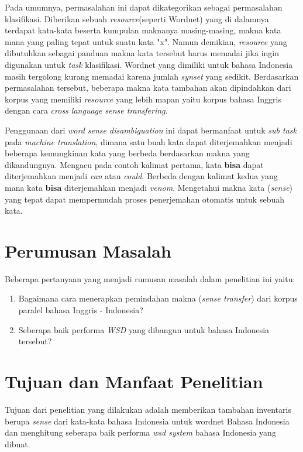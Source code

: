 Pada umumnya, permasalahan ini dapat dikategorikan sebagai permasalahan klasifikasi. Diberikan sebuah \textit{resource}(seperti Wordnet) yang di dalamnya terdapat kata-kata beserta kumpulan maknanya masing-masing, makna kata mana yang paling tepat untuk suatu kata "x". Namun demikian, \textit{resource} yang dibutuhkan sebagai panduan makna kata tersebut harus memadai jika ingin digunakan untuk \textit{task} klasifikasi. Wordnet yang dimiliki untuk bahasa Indonesia masih tergolong kurang memadai karena jumlah \textit{synset} yang sedikit. Berdasarkan permasalahan tersebut, beberapa makna kata tambahan akan dipindahkan dari korpus yang memiliki \textit{resource} yang lebih mapan yaitu korpus bahasa Inggris dengan cara \textit{cross language sense transfering}.

Penggunaan dari \textit{word sense disambiguation} ini dapat bermanfaat untuk \textit{sub task} pada \textit{machine translation}, dimana satu buah kata dapat diterjemahkan menjadi beberapa kemungkinan kata yang berbeda berdasarkan makna yang dikandungnya. Mengacu pada contoh kalimat pertama, kata \textbf{bisa} dapat diterjemahkan menjadi \textit{can} atau \textit{could}. Berbeda dengan kalimat kedua yang mana kata \textbf{bisa} diterjemahkan menjadi \textit{venom}. Mengetahui makna kata (\textit{sense}) yang tepat dapat mempermudah proses penerjemahan otomatis untuk sebuah kata.

\section{Perumusan Masalah}
Beberapa pertanyaan yang menjadi rumusan masalah dalam penelitian ini yaitu:
\begin{enumerate}
	\item Bagaimana cara menerapkan pemindahan makna (\textit{sense transfer}) dari korpus paralel bahasa Inggris - Indonesia?
	\item Seberapa baik performa \textit{WSD} yang dibangun untuk bahasa Indonesia tersebut?
\end{enumerate}

\section{Tujuan dan Manfaat Penelitian}
Tujuan dari penelitian yang dilakukan adalah memberikan tambahan inventaris berupa \textit{sense} dari kata-kata bahasa Indonesia untuk wordnet Bahasa Indonesia dan menghitung seberapa baik performa \textit{wsd system} bahasa Indonesia yang dibuat.

